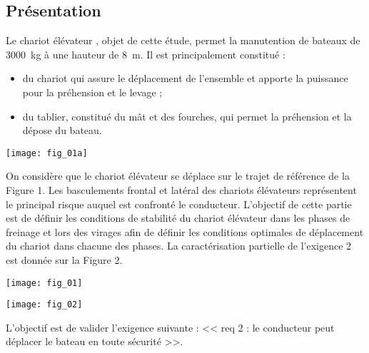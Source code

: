 \def\columnseprulecolor{\color{ocre}}
\setlength{\columnseprule}{0.4pt} 


\setcounter{exo}{0}

\ifprof
\else
\begin{multicols}{2}
\fi

\subsection*{Présentation}

\ifprof
\else
Le chariot élévateur , objet de cette étude,  permet la manutention de bateaux de \SI{3000}{kg}
à une hauteur de \SI{8}{m}. Il est principalement constitué :
\begin{itemize}
\item du chariot qui assure le déplacement de l’ensemble et apporte la puissance pour la préhension
et le levage ;
\item du tablier, constitué du mât et des fourches, qui permet la préhension et la dépose du bateau.
\end{itemize}

\begin{center}
\texttt{[image: fig\_01a]}
\end{center} 
On considère que le chariot élévateur se déplace sur le trajet de référence de la Figure 1. Les basculements frontal et latéral des chariots élévateurs représentent le principal risque auquel est confronté le conducteur. L’objectif de cette partie est de définir les conditions de stabilité du chariot élévateur dans les phases de freinage et lors des virages afin de définir les conditions optimales de déplacement du chariot dans chacune des phases.
La caractérisation partielle de l'exigence 2 est donnée sur la Figure 2.



\begin{center}
\texttt{[image: fig\_01]}
\end{center}

\begin{center}
\texttt{[image: fig\_02]}
\end{center}

\begin{obj}
L'objectif est de valider l'exigence suivante : << req 2 : le conducteur peut déplacer le bateau en toute sécurité >>. 
\end{obj}
\fi


\end{multicols}

